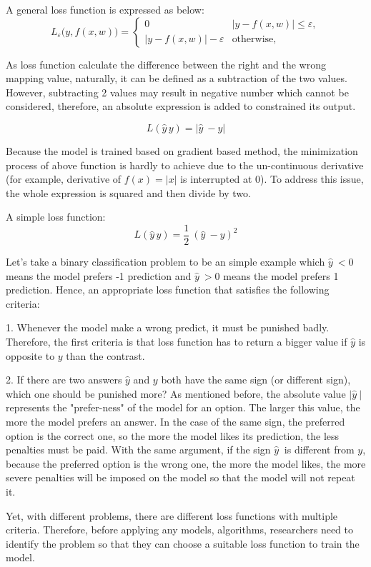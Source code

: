 	A general loss function is expressed as below:
	\[
	L_\varepsilon\bigl(y,f(x,w)\bigr)=
	\begin{cases}
	0 & \bigl|y-f(x,w)\bigr|\leq\varepsilon,\\
	\bigl|y-f(x,w)\bigr|-\varepsilon & \text{otherwise},
	\end{cases}
	\]
	
	As loss function calculate the difference between the right and the wrong mapping value, naturally, it can be defined as a subtraction of the two values. However, subtracting 2 values may result in negative number which cannot be considered, therefore, an absolute expression is added to constrained its output.
	
	\[L(\hat{y}\,y) = | \hat{y}\ - y | \]
	
	Because the model is trained based on gradient based method, the minimization process of above function is hardly to achieve due to the un-continuous derivative (for example, derivative of $f(x) = |x|$ is interrupted at 0). To address this issue, the whole expression is squared and then divide by two.
	
	A simple loss function:
	\[L(\hat{y}\,y) = \frac{1}{2}\ (\hat{y}\ - y)^2 \]
	
	Let's take a binary classification problem to be an simple example which $\hat{y}\ < 0$ means the model prefers -1 prediction and $\hat{y}\ > 0$ means the model prefers 1 prediction. Hence, an appropriate loss function that satisfies the following criteria:
	
	1. Whenever the model make a wrong predict, it must be punished badly. Therefore, the first criteria is that loss function has to return a bigger value if $\hat{y}$ is opposite to $y$ than the contrast.
	
	2. If there are two answers $\hat{y}$ and $y$ both have the same sign (or different sign), which one should be punished more? As mentioned before, the absolute value $| \hat{y}\ |$ represents the "prefer-ness" of the model for an option. The larger this value, the more the model prefers an answer. In the case of the same sign, the preferred option is the correct one, so the more the model likes its prediction, the less penalties must be paid. With the same argument, if the sign $ \hat{y}\ $ is different from $y$, because the preferred option is the wrong one, the more the model likes, the more severe penalties will be imposed on the model so that the model will not repeat it. 

	Yet, with different problems, there are different loss functions with multiple criteria. Therefore, before applying any models, algorithms, researchers need to identify the problem so that they can choose a suitable loss function to train the model.

